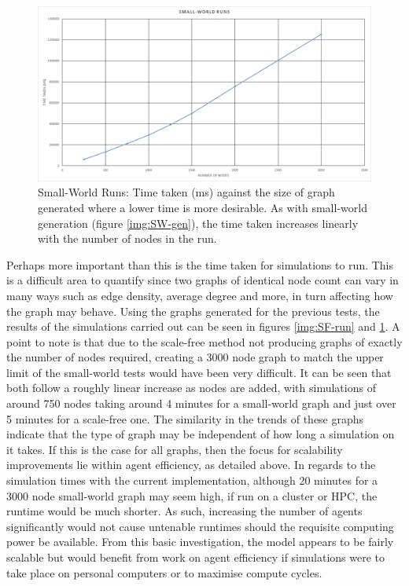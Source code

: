 \documentclass[]{report}
\begin{document}
\begin{figure}
\begin{center}
\includegraphics[width=\textwidth]{small-world-runs.png}
\end{center}
\caption{Small-World Runs: Time taken (ms) against the size of graph generated where a lower time is more desirable. As with small-world generation (figure \ref{img:SW-gen}), the time taken increases linearly with the number of nodes in the run.}
\label{img:SW-run}
\end{figure}

Perhaps more important than this is the time taken for simulations to run. This is a difficult area to quantify since two graphs of identical node count can vary in many ways such as edge density, average degree and more, in turn affecting how the graph may behave. Using the graphs generated for the previous tests, the results of the simulations carried out can be seen in figures \ref{img:SF-run} and \ref{img:SW-run}. A point to note is that due to the scale-free method not producing graphs of exactly the number of nodes required, creating a 3000 node graph to match the upper limit of the small-world tests would have been very difficult. It can be seen that both follow a roughly linear increase as nodes are added, with simulations of around 750 nodes taking around 4 minutes for a small-world graph and just over 5 minutes for a scale-free one. The similarity in the trends of these graphs indicate that the type of graph may be independent of how long a simulation on it takes. If this is the case for all graphs, then the focus for scalability improvements lie within agent efficiency, as detailed above. In regards to the simulation times with the current implementation, although 20 minutes for a 3000 node small-world graph may seem high, if run on a cluster or HPC, the runtime would be much shorter. As such, increasing the number of agents significantly would not cause untenable runtimes should the requisite computing power be available. From this basic investigation, the model appears to be fairly scalable but would benefit from work on agent efficiency if simulations were to take place on personal computers or to maximise compute cycles.
\end{document}

